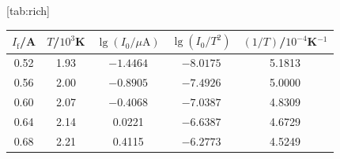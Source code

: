 [tab:rich]{
\begin{tabular}{ccccc}
\toprule
$I_\mathrm{f}$/A & $T$/$10^3$K & $\lg(I_0/\mu\mathrm{A})$ & $\lg(I_0/T^2)$ & $(1/T)$/$10^{-4}$K$^{-1}$ \\
\midrule
0.52 & 1.93 & $-1.4464$ & $-8.0175$ & 5.1813 \\
0.56 & 2.00 & $-0.8905$ & $-7.4926$ & 5.0000 \\
0.60 & 2.07 & $-0.4068$ & $-7.0387$ & 4.8309 \\
0.64 & 2.14 & 0.0221 & $-6.6387$ & 4.6729 \\
0.68 & 2.21 & 0.4115 & $-6.2773$ & 4.5249 \\
\bottomrule
\end{tabular}}
